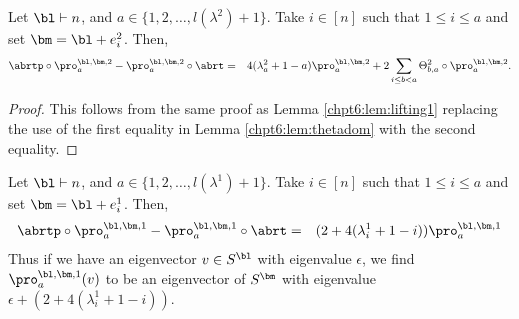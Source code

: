 \documentclass[11pt]{report}
\begin{document}
\begin{lemma}
	\label{chpt6:lem:lifting2}
	Let $\bl \vdash n$, and  $a \in \{1,2,\ldots,l(\lambda^{2})+1\}$. Take $i\in [n]$ such that  $1 \leq i \leq a$ and set $\bm = \bl +e_{i}^{2}$. Then,
	\begin{eqnarray*}
		\abrtp \circ \pro^{\bl,\bm,2}_{a} - 
		\pro^{\bl,\bm,2}_{a}  \circ  \abrt& = & 
		4(\lambda^{2}_{a}+1-a) \pro^{\bl,\bm,2}_{a} +   2
		\sum_{i\leq b < a} 
		\Theta_{b,a}^{2} \circ 
		\pro^{\bl,\bm,2}_{a}.
	\end{eqnarray*}
\end{lemma}
\begin{proof}
	This follows from the same proof as Lemma \ref{chpt6:lem:lifting1} replacing the use of the first equality in Lemma \ref{chpt6:lem:thetadom} with the second equality.
\end{proof}



\begin{thm}
	\label{chpt6:thm:lifting1}
	Let $\bl \vdash n$, and  $a \in \{1,2,\ldots,l(\lambda^{1})+1\}$. Take $i\in [n]$ such that  $1 \leq i \leq a$ and set $\bm = \bl +e_{i}^{1}$. Then,
	\begin{eqnarray*}
		\abrtp\circ \pro^{\bl,\bm,1}_{a} - 
		\pro^{\bl,\bm,1}_{a} \circ \abrt & = & (2 
		+ 
		4(\lambda_{i}^{1}+1-i))\pro^{\bl,\bm,1}_{a}
	\end{eqnarray*}
	Thus if we have an eigenvector $v \in S^{\bl}$ with 
	eigenvalue $\epsilon$, we find 
	$\pro^{\bl,\bm,1}_{a}(v)$ to be an eigenvector of
	$S^{\bm}$ with eigenvalue $\epsilon + (2 + 
	4(\lambda^{1}_{i}+1-i))$.
\end{thm}
\end{document}
